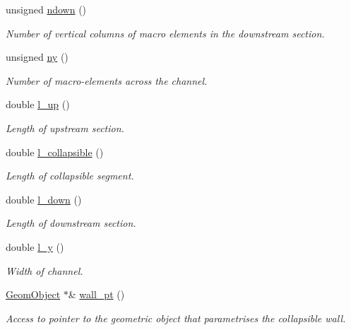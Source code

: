 \begin{DoxyCompactItemize}
unsigned \hyperlink{classoomph_1_1CollapsibleChannelDomain_a0e1c69ac122606e4f883e96b51989d9f}{ndown} ()
\begin{DoxyCompactList}\small\item\em Number of vertical columns of macro elements in the downstream section. \end{DoxyCompactList}\item 
unsigned \hyperlink{classoomph_1_1CollapsibleChannelDomain_a62e15782984f3d5e10ba44a6d8ad06ee}{ny} ()
\begin{DoxyCompactList}\small\item\em Number of macro-\/elements across the channel. \end{DoxyCompactList}\item 
double \hyperlink{classoomph_1_1CollapsibleChannelDomain_a3773afa34e21e3e4ed7a86cf42808dd7}{l\+\_\+up} ()
\begin{DoxyCompactList}\small\item\em Length of upstream section. \end{DoxyCompactList}\item 
double \hyperlink{classoomph_1_1CollapsibleChannelDomain_a0b38028581a27e6b34529ba2c3fa1af2}{l\+\_\+collapsible} ()
\begin{DoxyCompactList}\small\item\em Length of collapsible segment. \end{DoxyCompactList}\item 
double \hyperlink{classoomph_1_1CollapsibleChannelDomain_a93dc02b16ab1cbab2f42f62d0a7aeb8e}{l\+\_\+down} ()
\begin{DoxyCompactList}\small\item\em Length of downstream section. \end{DoxyCompactList}\item 
double \hyperlink{classoomph_1_1CollapsibleChannelDomain_ab95f48218b922883be6c8b9bfb39c2a8}{l\+\_\+y} ()
\begin{DoxyCompactList}\small\item\em Width of channel. \end{DoxyCompactList}\item 
\hyperlink{classoomph_1_1GeomObject}{Geom\+Object} $\ast$\& \hyperlink{classoomph_1_1CollapsibleChannelDomain_a0a98c02b478d61d2cd4c899d0d37344a}{wall\+\_\+pt} ()
\begin{DoxyCompactList}\small\item\em Access to pointer to the geometric object that parametrises the collapsible wall. \end{DoxyCompactList}\item 

\end{DoxyCompactItemize}
